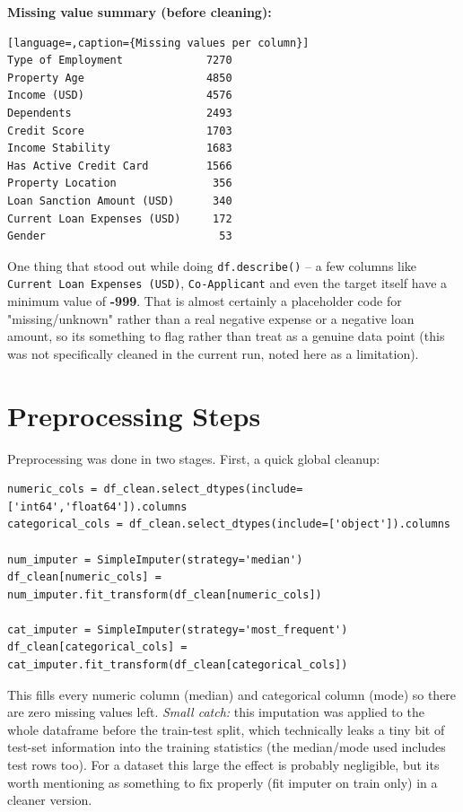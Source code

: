 \documentclass[12pt,a4paper]{article}
\begin{document}
\textbf{Missing value summary (before cleaning):}
\begin{lstlisting}[language=,caption={Missing values per column}]
Type of Employment             7270
Property Age                   4850
Income (USD)                   4576
Dependents                     2493
Credit Score                   1703
Income Stability               1683
Has Active Credit Card         1566
Property Location               356
Loan Sanction Amount (USD)      340
Current Loan Expenses (USD)     172
Gender                           53
\end{lstlisting}

One thing that stood out while doing \texttt{df.describe()} -- a few columns like \texttt{Current Loan Expenses (USD)}, \texttt{Co-Applicant} and even the target itself have a minimum value of \textbf{-999}. That is almost certainly a placeholder code for "missing/unknown" rather than a real negative expense or a negative loan amount, so its something to flag rather than treat as a genuine data point (this was not specifically cleaned in the current run, noted here as a limitation).

\section{Preprocessing Steps}
Preprocessing was done in two stages. First, a quick global cleanup:
\begin{lstlisting}[caption={Initial missing-value cleanup}]
numeric_cols = df_clean.select_dtypes(include=['int64','float64']).columns
categorical_cols = df_clean.select_dtypes(include=['object']).columns

num_imputer = SimpleImputer(strategy='median')
df_clean[numeric_cols] = num_imputer.fit_transform(df_clean[numeric_cols])

cat_imputer = SimpleImputer(strategy='most_frequent')
df_clean[categorical_cols] = cat_imputer.fit_transform(df_clean[categorical_cols])
\end{lstlisting}
This fills every numeric column (median) and categorical column (mode) so there are zero missing values left. \textit{Small catch:} this imputation was applied to the whole dataframe before the train-test split, which technically leaks a tiny bit of test-set information into the training statistics (the median/mode used includes test rows too). For a dataset this large the effect is probably negligible, but its worth mentioning as something to fix properly (fit imputer on train only) in a cleaner version.
\end{document}
